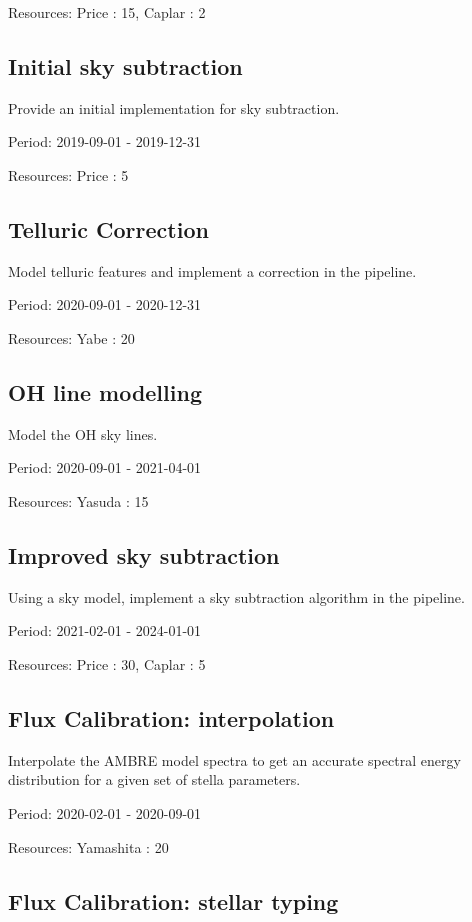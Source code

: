 Resources: Price : 15, Caplar : 2

\subsection{Initial sky subtraction}

Provide an initial implementation for sky subtraction.

Period: 2019-09-01 - 2019-12-31

Resources: Price : 5

\subsection{Telluric Correction}

Model telluric features and implement a correction in the pipeline.

Period: 2020-09-01 - 2020-12-31

Resources: Yabe : 20

\subsection{OH line modelling}

Model the OH sky lines.

Period: 2020-09-01 - 2021-04-01

Resources: Yasuda : 15

\subsection{Improved sky subtraction}

Using a sky model, implement a sky subtraction algorithm in the pipeline.

Period: 2021-02-01 - 2024-01-01

Resources: Price : 30, Caplar : 5

\subsection{Flux Calibration: interpolation}

Interpolate the AMBRE model spectra to get an accurate spectral energy distribution for a given set of stella parameters.

Period: 2020-02-01 - 2020-09-01

Resources: Yamashita : 20

\subsection{Flux Calibration: stellar typing}

